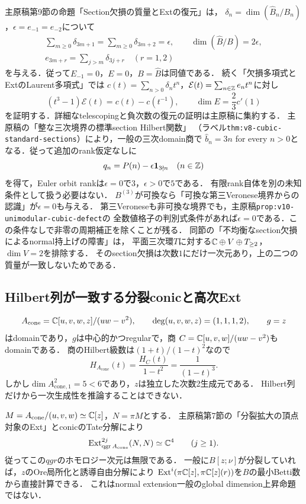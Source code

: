 \documentclass[11pt,a4paper]{ltjsarticle}
\begin{document}
主原稿第9節の命題「Section欠損の質量とExtの復元」は，
$\delta_n=\dim(\widehat B_n/B_n)$，$\epsilon=e_{-1}=e_{-2}$について
\[
 \begin{gathered}
 \sum_{m\geq0}\delta_{3m+1}
 =\sum_{m\geq0}\delta_{3m+2}=\epsilon,
 \qquad \dim(\widehat B/B)=2\epsilon,\\
 e_{3m+r}=\sum_{j>m}\delta_{3j+r}\quad(r=1,2)
 \end{gathered}
\]
を与える．従って$E_{-1}=0$，$E=0$，$B=\widehat B$は同値である．
続く「欠損多項式とExtのLaurent多項式」では
$c(t)=\sum_{n>0}\delta_nt^n$，$\mathcal E(t)=\sum_{n\in\mathbb Z}e_nt^n$に対し
\[
 (t^3-1)\mathcal E(t)=c(t)-c(t^{-1}),\qquad
 \dim E=\frac23c'(1)
\]
を証明する．詳細なtelescopingと負次数の復元の証明は主原稿に集約する．
主原稿の「整な三次境界の標準section Hilbert関数」
（ラベル\texttt{thm:v8-cubic-standard-sections}）により，一般の三次domain商で
$\widehat b_n=3n$ for every $n>0$となる．従って追加のrank仮定なしに
\[
 q_n=P(n)-\epsilon\mathbf1_{3\nmid n}\quad(n\in\mathbb Z)
\]
を得て，Euler orbit rankは$\epsilon=0$で$3$，$\epsilon>0$で$5$である．
有限rank自体を別の未知条件として扱う必要はない．
$B^{(3)}$が可換なら「可換な第三Veronese境界からの認識」が$\epsilon=0$も与える．
第三Veroneseも非可換な境界でも，主原稿\texttt{prop:v10-unimodular-cubic-defect}の
全数値格子の判別式条件があれば$\epsilon=0$である．この条件なしで非零の周期補正を除くことが残る．
同節の「不均衡なsection欠損によるnormal持上げの障害」は，
平面三次環$T$に対する$\mathbb C\oplus V\oplus T_{\geq2}$，$\dim V=2$を排除する．
そのsection欠損は次数$1$にだけ一次元あり，上の二つの質量が一致しないためである．

\subsection{Hilbert列が一致する分裂conicと高次Ext}\label{subsec:split-conic-obstruction}
\[
 A_{\mathrm{cone}}=\mathbb C[u,v,w,z]/(uw-v^2),\qquad
 \deg(u,v,w,z)=(1,1,1,2),\qquad g=z
\]
はdomainであり，$g$は中心的かつregularで，商
$C=\mathbb C[u,v,w]/(uw-v^2)$もdomainである．
商のHilbert級数は$(1+t)/(1-t)^2$なので
\[
 H_{A_{\mathrm{cone}}}(t)=\frac{H_C(t)}{1-t^2}=\frac1{(1-t)^3}.
\]
しかし$\dim A_{\mathrm{cone},1}^2=5<6$であり，$z$は独立した次数2生成元である．
Hilbert列だけから一次生成性を推論することはできない．

$M=A_{\mathrm{cone}}/(u,v,w)\simeq\mathbb C[z]$，$N=\pi M$とする．
主原稿第7節の「分裂拡大の頂点対象のExt」とconicのTate分解により
\[
 \operatorname{Ext}^{2j}_{\operatorname{qgr} A_{\mathrm{cone}}}(N,N)\simeq\mathbb C^4
 \qquad(j\geq1).
\]
従ってこの$qgr$のホモロジー次元は無限である．
一般に$B[z;\nu]$が分裂していれば，$z$のOre局所化と誘導自由分解により
$\operatorname{Ext}^i(\pi\mathbb C[z],\pi\mathbb C[z](r))$を$B$の最小Betti数から直接計算できる．
これはnormal extension一般のglobal dimension上昇命題ではない．
\end{document}
